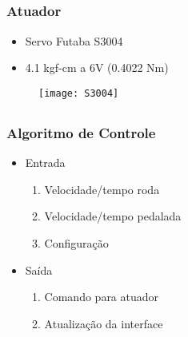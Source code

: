 \documentclass{beamer}
\begin{document}
\subsection{}
\begin{frame}
  \frametitle{Atuador}
  \begin{itemize}
    \item Servo Futaba S3004
    \item 4.1 kgf-cm a 6V (0.4022 Nm)
  \end{itemize}
\begin{figure}[ht]
 \begin{center}
  \texttt{[image: S3004]}
 \end{center}
\end{figure}
\end{frame}

\subsection{}
\begin{frame}
\begin{figure}
 \centering
   \hfil
   \hfil
\end{figure}
\end{frame}



\subsection{}
\begin{frame}
 \frametitle{Algoritmo de Controle}
  \begin{itemize}
    \item Entrada
    \begin{enumerate}
     \item Velocidade/tempo roda
      \item Velocidade/tempo pedalada
      \item Configuração
    \end{enumerate}
    \item Saída
     \begin{enumerate}
      \item Comando para atuador
      \item Atualização da interface
     \end{enumerate}

  \end{itemize}

\end{frame}
\end{document}
